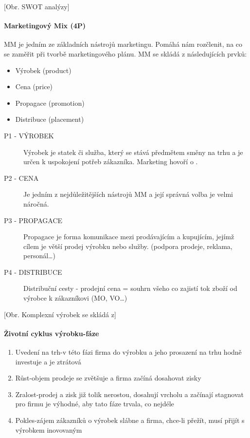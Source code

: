 \documentclass[11pt,a4paper,twoside]{book}
\begin{document}
	[Obr. SWOT analýzy]

	\paragraph*{Marketingový Mix (4P)}
	MM je jedním ze základních nástrojů marketingu. Pomáhá nám rozčlenit, na co se zaměřit při tvorbě marketingového plánu.
	MM se skládá z následujících prvků:
	\begin{itemize}
		\item Výrobek (product)
		\item Cena (price)
		\item Propagace (promotion)
		\item Distribuce (placement)
	\end{itemize}

	\begin{description}
		\item[P1 - VÝROBEK] Výrobek je statek či služba, který se stává předmětem směny na trhu a je určen k uspokojení potřeb zákazníka. Marketing hovoří o .
		\item[P2 - CENA] Je jedním z nejdůležitějších nástrojů MM a její správná volba je velmi náročná.
		\item[P3 - PROPAGACE] Propagace je forma komunikace mezi prodávajícím a kupujícím, jejímž cílem je větší prodej výrobku nebo služby. (podpora prodeje, reklama, personál\ldots)
		\item[P4 - DISTRIBUCE] Distribuční cesty - prodejní cena = souhrn všeho co zajistí tok zboží od výrobce k zákazníkovi (MO, VO\ldots)
	\end{description}

	[Obr. Komplexní výrobek se skládá z]

	\paragraph*{Životní cyklus výrobku-fáze}
	\begin{enumerate}
		\item Uvedení na trh-v této fázi firma do výrobku a jeho prosazení na trhu hodně investuje a je ztrátová
		\item Růst-objem prodeje se zvětšuje a firma začíná dosahovat zisky
		\item Zralost-prodej a zisk již tolik nerostou, dosahují vrcholu a začínají stagnovat pro firmu je výhodné, aby tato fáze trvala, co nejdéle
		\item Pokles-zájem zákazníků o výrobek slábne a firma, chce-li přežít, musí přijít s výrobkem inovovaným
	\end{enumerate}
\end{document}
